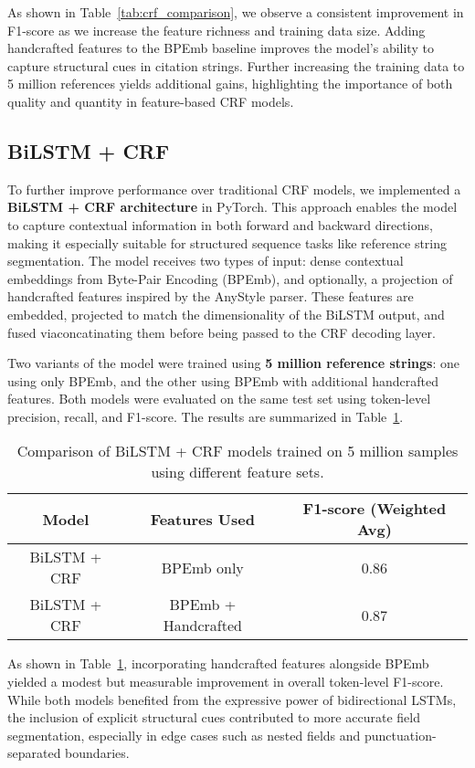 As shown in Table~\ref{tab:crf_comparison}, we observe a consistent improvement in F1-score as we increase the feature richness and training data size. Adding handcrafted features to the BPEmb baseline improves the model's ability to capture structural cues in citation strings. Further increasing the training data to 5 million references yields additional gains, highlighting the importance of both quality and quantity in feature-based CRF models.


\subsection{BiLSTM + CRF}
To further improve performance over traditional CRF models, we implemented a \textbf{BiLSTM + CRF architecture} in PyTorch. This approach enables the model to capture contextual information in both forward and backward directions, making it especially suitable for structured sequence tasks like reference string segmentation. The model receives two types of input: dense contextual embeddings from Byte-Pair Encoding (BPEmb), and optionally, a projection of handcrafted features inspired by the AnyStyle parser. These features are embedded, projected to match the dimensionality of the BiLSTM output, and fused viaconcatinating them before being passed to the CRF decoding layer.

Two variants of the model were trained using \textbf{5 million reference strings}: one using only BPEmb, and the other using BPEmb with additional handcrafted features. Both models were evaluated on the same test set using token-level precision, recall, and F1-score. The results are summarized in Table~\ref{tab:bilstm_comparison}.
\begin{table}[h]
    \centering
    \begin{tabular}{|c|c|c|}
    \hline
    \textbf{Model} & \textbf{Features Used} & \textbf{F1-score (Weighted Avg)} \\
    \hline
    BiLSTM + CRF & BPEmb only & 0.86 \\
    BiLSTM + CRF & BPEmb + Handcrafted & 0.87 \\
    \hline
    \end{tabular}
    \caption[BiLSTM+CRF Feature Set Comparison]{Comparison of BiLSTM + CRF models trained on 5 million samples using different feature sets.}
    \label{tab:bilstm_comparison}
\end{table}

As shown in Table~\ref{tab:bilstm_comparison}, incorporating handcrafted features alongside BPEmb yielded a modest but measurable improvement in overall token-level F1-score. While both models benefited from the expressive power of bidirectional LSTMs, the inclusion of explicit structural cues contributed to more accurate field segmentation, especially in edge cases such as nested fields and punctuation-separated boundaries.

